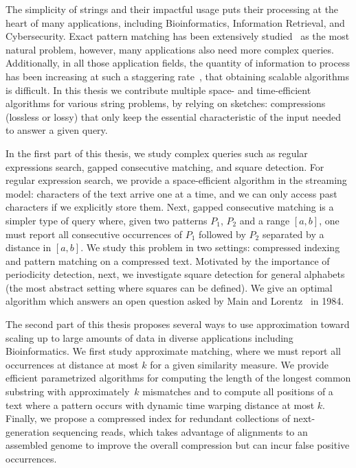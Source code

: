 The simplicity of strings and their impactful usage puts their processing at the heart of many applications, including Bioinformatics, Information Retrieval, and Cybersecurity. Exact pattern matching has been extensively studied~\cite{Charras2004} as the most natural problem, however, many applications also need more complex queries. Additionally, in all those application fields, the quantity of information to process has been increasing at such a staggering rate~\cite{muir2016real}, that obtaining scalable algorithms is difficult.
In this thesis we contribute multiple space- and time-efficient algorithms for various string problems, by relying on sketches: compressions (lossless or lossy) that only keep the essential characteristic of the input needed to answer a given query.%

In the first part of this thesis, we study complex queries such as regular expressions search, gapped consecutive matching, and square detection. 
For regular expression search, we provide a space-efficient algorithm in the streaming model: characters of the text arrive one at a time, and we can only access past characters if we explicitly store them. 
Next, gapped consecutive matching is a simpler type of query where, given two patterns $P_1$, $P_2$ and a range $[a,b]$, one must report all consecutive occurrences of $P_1$ followed by $P_2$ separated by a distance in $[a,b]$. We study this problem in two settings: compressed indexing and pattern matching on a compressed text.
Motivated by the importance of periodicity detection, next, we investigate square detection for general alphabets (the most abstract setting where squares can be defined). We give an optimal algorithm which answers an open question asked by Main and Lorentz~\cite{Main1984} in 1984.



The second part of this thesis proposes several ways to use approximation toward scaling up to large amounts of data in diverse applications including Bioinformatics.
We first study approximate matching, where we must report all occurrences at distance at most $k$ for a given similarity measure. %
We provide efficient parametrized algorithms for computing the length of the longest common substring with approximately~$k$ mismatches and to compute all positions of a text where a pattern occurs with dynamic time warping distance at most $k$.
Finally, we propose a compressed index for redundant collections of next-generation sequencing reads, which takes advantage of alignments to an assembled genome to improve the overall compression but can incur false positive occurrences.

